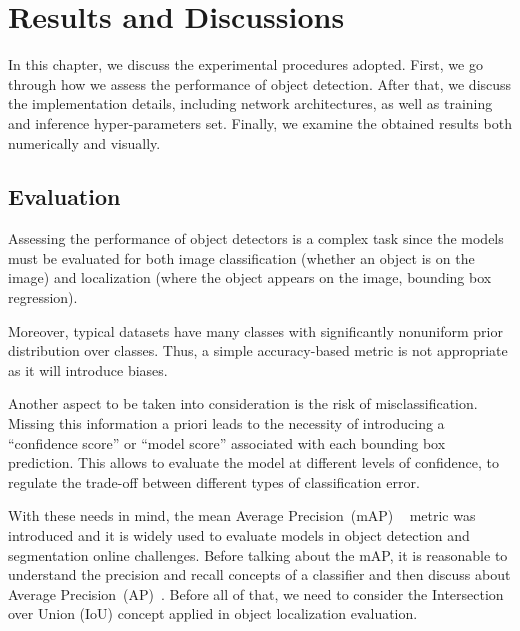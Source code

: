 \chapter{Results and Discussions}
\label{chap:results}
%
In this chapter, we discuss the experimental procedures adopted.
First, we go through how we assess the performance of object detection.
After that, we discuss the implementation details, including network architectures, as well as training and inference hyper-parameters set.
Finally, we examine the obtained results both numerically and visually.


\section{Evaluation}
\label{sec:eval}

Assessing the performance of object detectors
is a complex task since the models must be evaluated for both image classification (whether an object is on the image)  and localization (where the object appears on the image, \ie bounding box regression).

Moreover, typical datasets have many classes with significantly nonuniform prior distribution over classes.
Thus, a simple accuracy-based metric is not appropriate as it will introduce biases.

Another aspect to be taken into consideration is the risk of misclassification.
Missing this information a priori leads to the necessity of introducing a ``confidence score'' or ``model score'' associated with each bounding box prediction.
This allows to evaluate the model at different levels of confidence, \ie
to regulate the trade-off between different types of classification error.

With these needs in mind, the mean Average Precision~(mAP)
~\cite{Everingham10}
metric was introduced and it is widely used to evaluate models in object detection and segmentation online challenges.
Before talking about the mAP, it is reasonable to understand the precision and recall concepts of a classifier and then
discuss about  Average Precision~(AP)~\cite{Everingham10}.
%
%
Before all of that, we need to consider the Intersection over Union (IoU)  concept applied in object localization evaluation.


